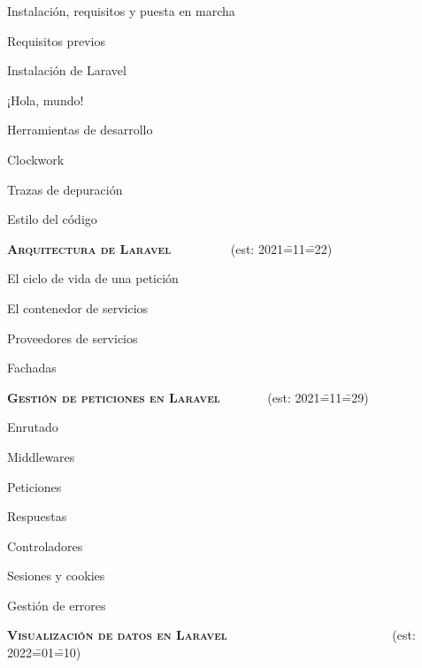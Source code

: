 \begin{longenum}
\begin{longenum}
\begin{longenum}
        \end{longenum}
        \item Instalación, requisitos y puesta en marcha
        \begin{longenum}
            \item Requisitos previos
            \item Instalación de Laravel
        \end{longenum}
        \item ¡Hola, mundo!
        \item Herramientas de desarrollo
        \begin{longenum}
            \item Clockwork
            \item Trazas de depuración
        \end{longenum}
        \item Estilo del código
    \end{longenum}
    \item \textbf{\textsc{Arquitectura de Laravel}} \ \ \ \ \ \ \ \ \ (est: 2021\==11\==22)
    \begin{longenum}
        \item El ciclo de vida de una petición
        \item El contenedor de servicios
        \item Proveedores de servicios
        \item Fachadas
    \end{longenum}
    \item \textbf{\textsc{Gestión de peticiones en Laravel}} \ \ \ \ \ \ \ (est: 2021\==11\==29)
    \begin{longenum}
        \item Enrutado
        \item Middlewares
        \item Peticiones
        \item Respuestas
        \item Controladores
        \item Sesiones y cookies
        \item Gestión de errores
    \end{longenum}
    \item \textbf{\textsc{Visualización de datos en Laravel}} \ \ \ \ \ \ \ \ \ \ \ \ \ \ \ \ \ \ \ \ \ \ \ \ \ \ (est: 2022\==01\==10)

\end{longenum}
